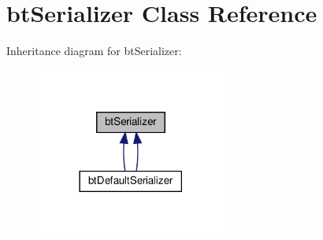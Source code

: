 \hypertarget{classbtSerializer}{}\section{bt\+Serializer Class Reference}
\label{classbtSerializer}


Inheritance diagram for bt\+Serializer\+:
\nopagebreak
\begin{figure}[H]
\begin{center}
\leavevmode
\includegraphics[width=177pt]{classbtSerializer__inherit__graph}
\end{center}
\end{figure}
